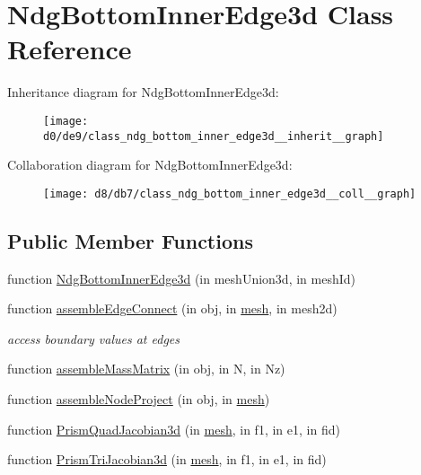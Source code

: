\hypertarget{class_ndg_bottom_inner_edge3d}{}\section{Ndg\+Bottom\+Inner\+Edge3d Class Reference}
\label{class_ndg_bottom_inner_edge3d}


Inheritance diagram for Ndg\+Bottom\+Inner\+Edge3d\+:
\nopagebreak
\begin{figure}[H]
\begin{center}
\leavevmode
\texttt{[image: d0/de9/class\_ndg\_bottom\_inner\_edge3d\_\_inherit\_\_graph]}
\end{center}
\end{figure}


Collaboration diagram for Ndg\+Bottom\+Inner\+Edge3d\+:
\nopagebreak
\begin{figure}[H]
\begin{center}
\leavevmode
\texttt{[image: d8/db7/class\_ndg\_bottom\_inner\_edge3d\_\_coll\_\_graph]}
\end{center}
\end{figure}
\subsection*{Public Member Functions}
\begin{DoxyCompactItemize}
\item 
function \hyperlink{class_ndg_bottom_inner_edge3d_a6f303b7ec7f68a8438e88e24c3143888}{Ndg\+Bottom\+Inner\+Edge3d} (in mesh\+Union3d, in mesh\+Id)
\item 
function \hyperlink{class_ndg_bottom_inner_edge3d_a41c071b69028c75d7d001ce554deff3a}{assemble\+Edge\+Connect} (in obj, in \hyperlink{class_ndg_bottom_inner_edge3d_a19345b1da21dfbe0866a8b543ecbb5d4}{mesh}, in mesh2d)
\begin{DoxyCompactList}\small\item\em access boundary values at edges \end{DoxyCompactList}\item 
function \hyperlink{class_ndg_bottom_inner_edge3d_ad9788783f22a53e1fa6c06ddca7e3113}{assemble\+Mass\+Matrix} (in obj, in N, in Nz)
\item 
function \hyperlink{class_ndg_bottom_inner_edge3d_a092660396bb366b44539ed57ab4d650b}{assemble\+Node\+Project} (in obj, in \hyperlink{class_ndg_bottom_inner_edge3d_a19345b1da21dfbe0866a8b543ecbb5d4}{mesh})
\item 
function \hyperlink{class_ndg_bottom_inner_edge3d_aead2e6af465c143f6b55f85df3d1d6d2}{Prism\+Quad\+Jacobian3d} (in \hyperlink{class_ndg_bottom_inner_edge3d_a19345b1da21dfbe0866a8b543ecbb5d4}{mesh}, in f1, in e1, in fid)
\item 
function \hyperlink{class_ndg_bottom_inner_edge3d_a28621bc088a74ad6b8e68e39bb0686d5}{Prism\+Tri\+Jacobian3d} (in \hyperlink{class_ndg_bottom_inner_edge3d_a19345b1da21dfbe0866a8b543ecbb5d4}{mesh}, in f1, in e1, in fid)
\end{DoxyCompactItemize}
